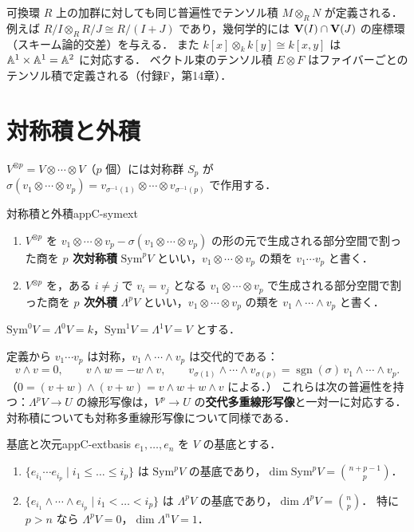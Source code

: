 \begin{note}
可換環 $R$ 上の加群に対しても同じ普遍性でテンソル積 $M\otimes_RN$ が定義される．
例えば $R/I\otimes_RR/J\cong R/(I+J)$ であり，幾何学的には $\mathbf{V}(I)\cap\mathbf{V}(J)$ の座標環（スキーム論的交差）を与える．
また $k[x]\otimes_kk[y]\cong k[x,y]$ は $\mathbb{A}^1\times\mathbb{A}^1=\mathbb{A}^2$ に対応する．
ベクトル束のテンソル積 $E\otimes F$ はファイバーごとのテンソル積で定義される（付録F，第14章）．
\end{note}

\section{対称積と外積}

$V^{\otimes p}=V\otimes\cdots\otimes V$（$p$ 個）には対称群 $S_p$ が
$\sigma(v_1\otimes\cdots\otimes v_p)=v_{\sigma^{-1}(1)}\otimes\cdots\otimes v_{\sigma^{-1}(p)}$ で作用する．

\begin{mydef}{対称積と外積}{appC-symext}
\begin{enumerate}
\item $V^{\otimes p}$ を $v_1\otimes\cdots\otimes v_p-\sigma(v_1\otimes\cdots\otimes v_p)$ の形の元で生成される部分空間で割った商を
\textbf{$p$ 次対称積} $\mathrm{Sym}^pV$ といい，$v_1\otimes\cdots\otimes v_p$ の類を $v_1\cdots v_p$ と書く．
\item $V^{\otimes p}$ を，ある $i\ne j$ で $v_i=v_j$ となる $v_1\otimes\cdots\otimes v_p$ で生成される部分空間で割った商を
\textbf{$p$ 次外積} $\Lambda^pV$ といい，$v_1\otimes\cdots\otimes v_p$ の類を $v_1\wedge\cdots\wedge v_p$ と書く．
\end{enumerate}
$\mathrm{Sym}^0V=\Lambda^0V=k$，$\mathrm{Sym}^1V=\Lambda^1V=V$ とする．
\end{mydef}

定義から $v_1\cdots v_p$ は対称，$v_1\wedge\cdots\wedge v_p$ は交代的である：
\[
v\wedge v=0,\qquad v\wedge w=-w\wedge v,\qquad
v_{\sigma(1)}\wedge\cdots\wedge v_{\sigma(p)}=\operatorname{sgn}(\sigma)\,v_1\wedge\cdots\wedge v_p .
\]
（$0=(v+w)\wedge(v+w)=v\wedge w+w\wedge v$ による．）
これらは次の普遍性を持つ：$\Lambda^pV\to U$ の線形写像は，$V^p\to U$ の\textbf{交代多重線形写像}と一対一に対応する．
対称積についても対称多重線形写像について同様である．

\begin{myprop}{基底と次元}{appC-extbasis}
$e_1,\dots,e_n$ を $V$ の基底とする．
\begin{enumerate}
\item $\{e_{i_1}\cdots e_{i_p}\mid i_1\leq\dots\leq i_p\}$ は $\mathrm{Sym}^pV$ の基底であり，$\dim\mathrm{Sym}^pV=\binom{n+p-1}{p}$．
\item $\{e_{i_1}\wedge\cdots\wedge e_{i_p}\mid i_1<\dots<i_p\}$ は $\Lambda^pV$ の基底であり，$\dim\Lambda^pV=\binom{n}{p}$．
特に $p>n$ なら $\Lambda^pV=0$，$\dim\Lambda^nV=1$．
\end{enumerate}
\end{myprop}

